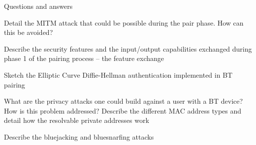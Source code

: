 \begin{section}{Questions and answers}
\begin{subsubsection}{Detail the MITM attack that could be possible during the pair phase. How can
    this be avoided?}
  \end{subsubsection}
  \begin{subsubsection}{Describe the security features and the input/output capabilities exchanged
    during phase 1 of the pairing process – the feature exchange}
  \end{subsubsection}
  \begin{subsubsection}{Sketch the Elliptic Curve Diffie-Hellman authentication implemented in BT
    pairing}
  \end{subsubsection}
  \begin{subsubsection}{What are the privacy attacks one could build against a user with a BT
      device? How is this problem addressed? Describe the different MAC address types and detail how
    the resolvable private addresses work}
  \end{subsubsection}
  \begin{subsubsection}{Describe the bluejacking and bluesnarfing attacks}
  \end{subsubsection}
\end{section}
